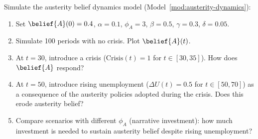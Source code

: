 \begin{exercise}[Computational]
Simulate the austerity belief dynamics model (Model~\ref{mod:austerity-dynamics}):
\begin{enumerate}[nosep]
  \item Set $\belief{A}(0) = 0.4$, $\alpha = 0.1$, $\phi_A = 3$, $\beta = 0.5$, $\gamma = 0.3$, $\delta = 0.05$.
  \item Simulate 100 periods with no crisis. Plot $\belief{A}(t)$.
  \item At $t = 30$, introduce a crisis ($\text{Crisis}(t) = 1$ for $t \in [30, 35]$). How does $\belief{A}$ respond?
  \item At $t = 50$, introduce rising unemployment ($\Delta U(t) = 0.5$ for $t \in [50, 70]$) as a consequence of the austerity policies adopted during the crisis. Does this erode austerity belief?
  \item Compare scenarios with different $\phi_A$ (narrative investment): how much investment is needed to sustain austerity belief despite rising unemployment?
\end{enumerate}
\end{exercise}

